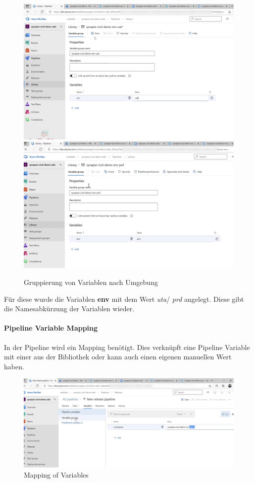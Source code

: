 \begin{figure}[H]
	\centering
	\includegraphics[scale = 0.2]{attachment/chapter_2/Scc156}
	\includegraphics[scale = 0.2]{attachment/chapter_2/Scc157}
	\caption{Gruppierung von Variablen nach Umgebung}
\end{figure}

Für diese wurde die Variablen \textbf{env} mit dem Wert \textit{uta}/ \textit{prd} angelegt. Diese gibt die Namesabkürzung der Variablen wieder.

\paragraph{Pipeline Variable Mapping}
In der Pipeline wird ein Mapping benötigt. Dies verknüpft eine Pipeline Variable mit einer aus der Bibliothek oder kann auch einen eigenen manuellen Wert haben.

\begin{figure}[H]
	\centering
	\includegraphics[scale = 0.2]{attachment/chapter_2/Scc158}
	\caption{Mapping of Variables}
\end{figure}

